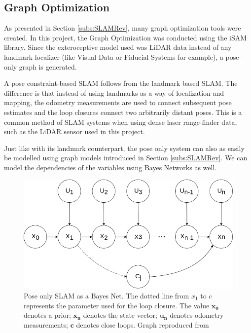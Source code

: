 \documentclass[11pt]{article}
\begin{document}
	\subsection{Graph Optimization}
	\label{subs:GraphOpt}

As presented in Section \ref{subs:SLAMRev}, many graph optimization tools were created. In this project, the Graph Optimization was conducted using the iSAM library. Since the exteroceptive model used was LiDAR data instead of any landmark localizer (like Visual Data or Fiducial Systems for example), a pose-only graph is generated.

A pose constraint-based SLAM follows from the landmark based SLAM. The difference is that instead of using landmarks as a way of localization and mapping, the odometry measurements are used to connect subsequent pose estimates and the loop closures connect two arbitrarily distant poses. This is a common method of SLAM systems when using dense laser range-finder data, such as the LiDAR sensor used in this project. 

Just like with its landmark counterpart, the pose only system can also as easily be modelled using graph models introduced in Section \ref{subs:SLAMRev}. We can model the dependencies of the variables using Bayes Networks as well.
	
\begin{figure}
\begin{minipage}{0.65\textwidth}
\centering
\includegraphics[width=\textwidth]{BayesNetSLAMPoseOnly}
\end{minipage} \hfill
\begin{minipage}{0.35\textwidth}
\centering
\caption{Pose only SLAM as a Bayes Net. The dotted line from $x_1$ to $c$ represents the parameter used for the loop closure. The value $\mathbf{x_0}$ denotes a prior; $\mathbf{x_n}$ denotes the state vector; $\mathbf{u_n}$ denotes odometry measurements; $\mathbf{c}$ denotes close loops. Graph reproduced from \cite{Kaess08tro}}
\label{fig:slam2}
\end{minipage}				
\end{figure}
\end{document}
